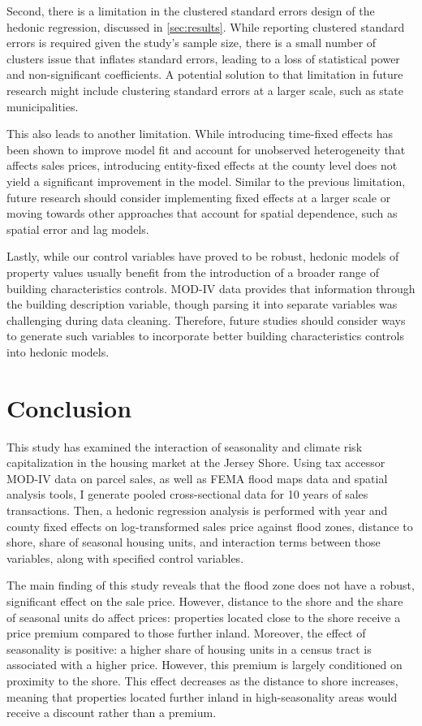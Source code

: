 \documentclass[11pt]{article}
\begin{document}
    Second, there is a limitation in the clustered standard errors design of the hedonic regression, discussed in \autoref{sec:results}. While reporting clustered standard errors is required given the study's sample size, there is a small number of clusters issue that inflates standard errors, leading to a loss of statistical power and non-significant coefficients. A potential solution to that limitation in future research might include clustering standard errors at a larger scale, such as state municipalities.

    This also leads to another limitation. While introducing time-fixed effects has been shown to improve model fit and account for unobserved heterogeneity that affects sales prices, introducing entity-fixed effects at the county level does not yield a significant improvement in the model. Similar to the previous limitation, future research should consider implementing fixed effects at a larger scale or moving towards other approaches that account for spatial dependence, such as spatial error and lag models.

    Lastly, while our control variables have proved to be robust, hedonic models of property values usually benefit from the introduction of a broader range of building characteristics controls. MOD-IV data provides that information through the building description variable, though parsing it into separate variables was challenging during data cleaning. Therefore, future studies should consider ways to generate such variables to incorporate better building characteristics controls into hedonic models. 

\section{Conclusion}

    This study has examined the interaction of seasonality and climate risk capitalization in the housing market at the Jersey Shore. Using tax accessor MOD-IV data on parcel sales, as well as FEMA flood maps data and spatial analysis tools, I generate pooled cross-sectional data for 10 years of sales transactions. Then, a hedonic regression analysis is performed with year and county fixed effects on log-transformed sales price against flood zones, distance to shore, share of seasonal housing units, and interaction terms between those variables, along with specified control variables.

    The main finding of this study reveals that the flood zone does not have a robust, significant effect on the sale price. However, distance to the shore and the share of seasonal units do affect prices: properties located close to the shore receive a price premium compared to those further inland. Moreover, the effect of seasonality is positive: a higher share of housing units in a census tract is associated with a higher price. However, this premium is largely conditioned on proximity to the shore. This effect decreases as the distance to shore increases, meaning that properties located further inland in high-seasonality areas would receive a discount rather than a premium. 
\end{document}
